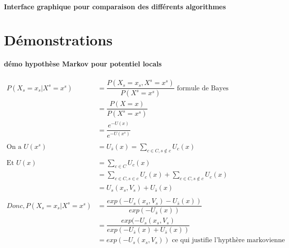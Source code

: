 \documentclass[fleqn]{article} %
\begin{document}
\paragraph{Interface graphique pour comparaison des différents algorithmes}




\section{Démonstrations}
\paragraph{démo hypothèse Markov pour potentiel locals}
\[
\begin{aligned}
	P(X_s= x_s | X^s= x^s)
		&= \dfrac{P(X_s= x_s, X^s= x^s)}{P(X^s= x^s)}  \text{  formule de Bayes}\\
		&= \dfrac{P(X= x)}{P(X^s= x^s)}\\
		&= \dfrac{e^{-U(x)}}{e^{-U(x^s)} }\\	
		&\ \\ 	
	\text{On a  } U(x^s)
		&= U_{\bar{s}}(x) = \sum_{c\in C, s\notin c}{U_c(x)}\\
		&\ \\
	\text{Et  } U(x) 
		&= \sum_{c\in C}{U_c(x)}\\
		&= \sum_{c\in C, s\in c}{U_c(x)} + \sum_{c\in C, s\notin c}{U_c(x)}\\
		&= U_s(x_s,V_s) + U_{\bar{s}}(x) \\
		&\ \\
	Donc, P(X_s= x_s | X^s= x^s)
		&=\dfrac{exp(-U_s(x_s,V_s) - U_{\bar{s}}(x))}  {exp(-U_{\bar{s}}(x))}\\
		&=\dfrac{exp(-U_s(x_s,V_s)}{exp(-U_{\bar{s}}(x) + U_{\bar{s}}(x))}\\
		&=exp(-U_s(x_s,V_s))   \text{   ce qui justifie l'hypthère markovienne}
\end{aligned}
\]



\end{document}
